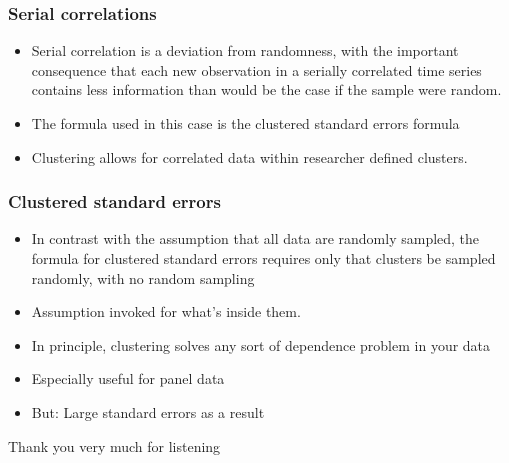 \documentclass{beamer}
\begin{document}
\begin{frame}
\frametitle{Serial correlations}
	\begin{itemize}
		\item Serial correlation is a deviation from randomness, with the important consequence that each new observation in a serially correlated time series contains less information than would be the case if the sample were random.
		\item The formula used in this case is the clustered standard errors formula
		\item Clustering allows for correlated data within researcher defined clusters. 

	\end{itemize}

\end{frame}


\begin{frame}
\frametitle{Clustered standard errors}
	\begin{itemize}
		\item In contrast with the assumption that all data are randomly sampled, the formula for clustered standard errors requires only that clusters be sampled randomly, with no random sampling
		\item Assumption invoked for what’s inside them.
		\item In principle, clustering solves any sort of dependence problem in your data 
		\item Especially useful for panel data
		\item But: Large standard errors as a result
	\end{itemize}

\end{frame}


\begin{frame}
\Huge{\centerline{Thank you very much for listening}}
\end{frame}

\end{document}
